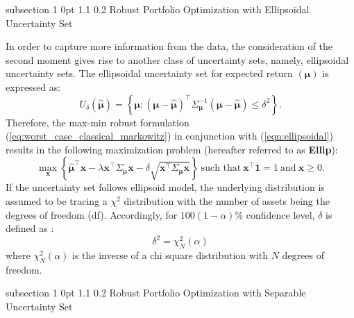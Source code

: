 \documentclass[12pt]{article}
\makeatletter
\numberwithin{equation}{section}
\renewcommand{\subsection}{
  \@startsection
  {subsection}%
  {1}%
  {0pt}%
  {1.1\baselineskip}%
  {0.2\baselineskip}%
  {\sc \centering}%
}
\makeatother
\begin{document}
\subsection{Robust Portfolio Optimization with Ellipsoidal Uncertainty Set}

In order to capture more information from the data, the consideration of the second moment gives rise to another class of uncertainty sets, namely, ellipsoidal uncertainty sets. The ellipsoidal uncertainty set for expected return $\left(\boldsymbol{\mu}\right)$ is expressed as:
\begin{equation}
\label{eqn:ellipsoidal}
U_{\delta}(\boldsymbol{\hat{\mu}})=\left\{\boldsymbol{\mu}: (\boldsymbol{\mu}-\boldsymbol{\hat{\mu}})^{\top}\Sigma^{-1}_{\boldsymbol{\mu}}
(\boldsymbol{\mu}-\boldsymbol{\hat{\mu}})\leq\delta^2 \right\}.
\end{equation}
Therefore, the max-min robust formulation (\ref{eq:worst_case_classical_markowitz}) in conjunction with (\ref{eqn:ellipsoidal}) results in the following maximization problem (hereafter referred to as \textbf{Ellip}):
\begin{equation}
\label{eqn:ellipsoidal_markowitz}
\max\limits_{\mathbf{x}}\left\{\boldsymbol{\hat{\mu}}^{\top}\mathbf{x}-\lambda \mathbf{x}^{\top}\Sigma_{\boldsymbol{\mu}}\mathbf{x}
-\delta\sqrt{\mathbf{x}^{\top}\Sigma_{\boldsymbol{\mu}}\mathbf{x}}\right\}~\text{such that}~\mathbf{x^{\top}}\mathbf{1}=1~\text{and}~\mathbf{x}\geq 0.
\end{equation}
If the uncertainty set follows ellipsoid model, the underlying distribution is assumed to be tracing a $\chi^2$ distribution with the number of assets being the degrees of freedom (df). Accordingly, for $100(1-\alpha)\%$ confidence level, $\delta$ is defined as \cite{Ceria06,Scherer07}:
\begin{equation}
\delta^2=\chi_{N}^2(\alpha)
\end{equation}
where $\chi_{N}^2(\alpha)$ is the inverse of a chi square distribution with $N$ degrees of freedom.

\subsection{Robust Portfolio Optimization with Separable Uncertainty Set}
\end{document}
